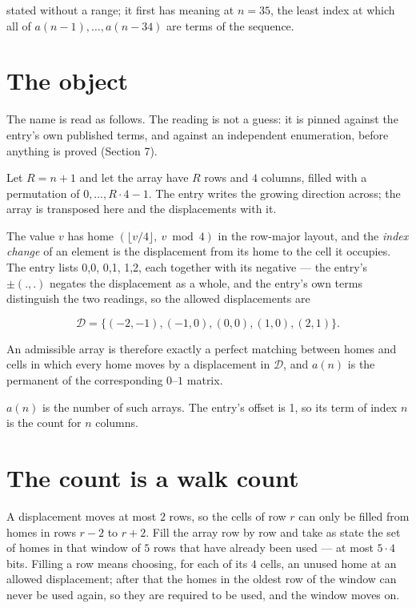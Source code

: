 \documentclass[11pt]{article}
\theoremstyle{definition}
\begin{document}
stated without a range; it first has meaning at $n = 35$, the least index at which all of $a(n-1),\dots,a(n-34)$ are terms of the sequence.

\section{The object}

The name is read as follows. The reading is not a guess: it is pinned against the entry's own published terms, and against an independent enumeration, before anything is proved (Section 7).

Let $R = n + 1$ and let the array have $R$ rows and $4$ columns, filled with a permutation of $0,\dots,R\cdot4-1$. The entry writes the growing direction across; the array is transposed here and the displacements with it.

The value $v$ has home $(\lfloor v/4\rfloor,\ v \bmod 4)$ in the row-major layout, and the {\itshape index change} of an element is the displacement from its home to the cell it occupies. The entry lists 0,0, 0,1, 1,2, each together with its negative --- the entry's $\pm(.,.)$ negates the displacement as a whole, and the entry's own terms distinguish the two readings, so the allowed displacements are

\[\mathcal{D} = \{(-2,-1), (-1,0), (0,0), (1,0), (2,1)\}.\]

An admissible array is therefore exactly a perfect matching between homes and cells in which every home moves by a displacement in $\mathcal{D}$, and $a(n)$ is the permanent of the corresponding $0$--$1$ matrix.

$a(n)$ is the number of such arrays. The entry's offset is 1, so its term of index $n$ is the count for $n$ columns.

\section{The count is a walk count}

A displacement moves at most $2$ rows, so the cells of row $r$ can only be filled from homes in rows $r-2$ to $r+2$. Fill the array row by row and take as state the set of homes in that window of $5$ rows that have already been used --- at most $5\cdot4$ bits. Filling a row means choosing, for each of its $4$ cells, an unused home at an allowed displacement; after that the homes in the oldest row of the window can never be used again, so they are required to be used, and the window moves on.
\end{document}
